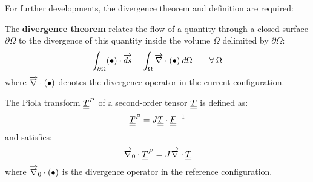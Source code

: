 For further developments, the divergence theorem and definition are required:
\begin{theorem}[Ostrogradski]
  The \textbf{divergence theorem} relates the flow of a quantity through a closed surface $\partial\Omega$ to the divergence of this quantity inside the volume $\Omega$ delimited by $\partial \Omega$:
\begin{equation}
  \label{eq:Ostrogradski_th}
  \int_{\partial \Omega} (\bullet)\cdot {\overrightarrow{ds}}=\int_\Omega {\overrightarrow{\nabla}} \cdot (\bullet) \: d\Omega \qquad \forall\:\Omega
\end{equation}
where ${\overrightarrow{\nabla}} \cdot (\bullet)$ denotes the divergence operator in the current configuration.  
\end{theorem}
\begin{definition}
  \label{def:Piola_transform}
  The Piola transform ${\underline{\underline{T}}}^P$ of a second-order tensor ${\underline{\underline{T}}}$ is defined as:
  \begin{equation*}
    {\underline{\underline{T}}}^P=J{\underline{\underline{T}}}\cdot{\underline{\underline{F}}}^{-1}
  \end{equation*}
  and satisfies:
  \begin{equation*}
    {\overrightarrow{\nabla}}_0\cdot {\underline{\underline{T}}}^P = J {\overrightarrow{\nabla}} \cdot {\underline{\underline{T}}}
  \end{equation*}
  where ${\overrightarrow{\nabla}}_0\cdot (\bullet)$ is the divergence operator in the reference configuration.
\end{definition}

